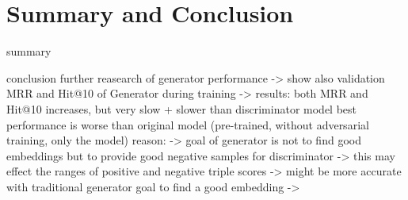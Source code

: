 \section{Summary and Conclusion}  
\label{sec:summary_and_conclusion}

summary



conclusion
further reasearch of generator performance 
-> show also validation MRR and Hit@10 of Generator during training
-> results:
both MRR and Hit@10 increases, but very slow + slower than discriminator model
best performance is worse than original model (pre-trained, without adversarial training, only the model)
reason:
-> goal of generator is not to find good embeddings but to provide good negative samples for discriminator
-> this may effect the ranges of positive and negative triple scores
-> might be more accurate with traditional generator goal to find a good embedding
->  



